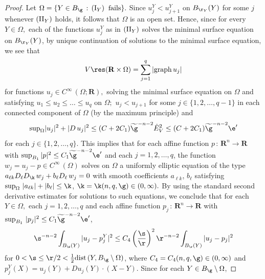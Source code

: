 \documentclass[a4paper,11pt]{amsart}
\begin{document}
\begin{proof}
Let $\Omega = \{Y \in B_{\g} \,: \, ({\rm I}_{Y}) \;\; {\rm fails}\}.$ Since $u_{j}^{Y} < u_{j+1}^{Y}$ on $B_{\r_{Y}}(Y)$ for some $j$ 
whenever $({\rm II}_{Y})$ holds, it follows that $\Omega$ is an open set. Hence, since for every 
$Y \in \Omega,$ each of the functions $u_{j}^{Y}$ as in $({\rm II}_{Y})$ solves the minimal surface equation on $B_{\r_{Y}}(Y)$, by unique continuation of solutions to the minimal surface equation, we see that
\begin{equation}\label{sheeting-14}
V \res ({\mathbf R} \times \Omega) = \sum_{j=1}^{q} |{\rm graph} \, u_{j}|
\end{equation}
for functions $u_{j} \in C^{\infty} \, (\Omega; {\mathbf R}),$ solving the minimal surface equation on $\Omega$ and 
satisfying $u_{1} \leq u_{2} \leq \ldots \leq u_{q}$ on $\Omega;$  
$u_{j}< u_{j+1}$ for some $j \in \{1, 2, \ldots, q-1\}$ in each connected component of $\Omega$ (by the maximum principle) and 
\begin{equation}\label{sheeting-14-1}
{\rm sup}_{\Omega} |u_{j}|^{2} + |D \, u_{j}|^{2}  \leq (C + 2C_{1})\widetilde{\g}^{-n-2}{\hat E}_{V}^{2} \leq (C + 2C_{1})\widetilde{\g}^{-n-2}\e^{\prime}
\end{equation}
for each $j \in \{1, 2, \ldots, q\}.$ This implies that for each affine function $p \, : \, {\mathbf R}^{n} \to {\mathbf R}$ with $\sup_{B_{1}} |p|^{2} \leq C_{1}\widetilde{\g}^{-n-2}\e^{\prime}$ and each $j = 1, 2, \ldots, q$, the function $w_{j} = u_{j} - p \in C^{\infty} \, (\Omega)$ solves on $\Omega$ a uniformly elliptic equation of the type $a_{\ell k} D_{\ell}D_{\k} \, w_{j} + b_{\ell}D_{\ell} \, w_{j}= 0$ with smooth coefficients $a_{\ell k}$, $b_{\ell}$ satisfying $\sup_{\Omega} \, |a_{\ell k}| +|b_{\ell}| \leq \k$, $\k = \k(n, q, \g) \in (0, \infty).$ By using the standard second derivative estimates for solutions to such equations, we conclude that for each $Y \in \Omega,$ each $j = 1, 2, \ldots, q$ and each affine function $p_{j} \, : \, {\mathbf R}^{n} \to {\mathbf R}$ with $\sup_{B_{1}} \, |p_{j}|^{2} \leq C_{1}\widetilde{\g}^{-n-2}\e^{\prime}$, 
\begin{equation}\label{sheeting-15}
\s^{-n-2}\int_{B_{\s}(Y)} |u_{j} - p_{j}^{Y}|^{2} \leq C_{4}\left(\frac{\s}{\r}\right)^{2} \r^{-n-2}\int_{B_{\r}(Y)} |u_{j} - p_{j}|^{2}
\end{equation}
for $0 < \s \leq \r/2 < \frac{1}{2}{\rm dist} \, (Y, B_{\g} \setminus \Omega)$,  where $C_{4} = C_{4}(n, q, \g) \in (0, \infty)$ and 
$p_{j}^{Y}(X) = u_{j}(Y) + Du_{j}(Y) \cdot (X -Y).$ Since for each $Y \in B_{\g} \setminus \Omega$, 

\end{proof}
\end{document}
